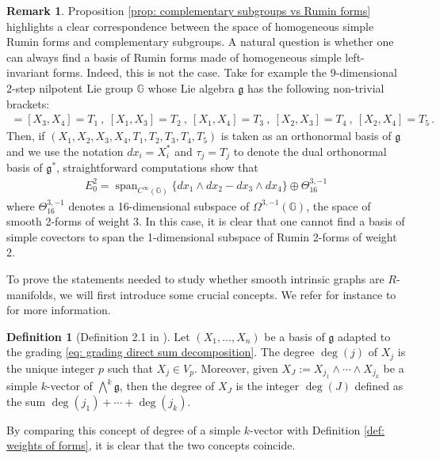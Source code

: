\documentclass[dvipsnames]{amsart}
\theoremstyle{definition}
\newtheorem{definition}[theorem]{Definition}
\newtheorem{remark}[theorem]{Remark}
\theoremstyle{definition}
\numberwithin{equation}{section}
\newcommand{\G}{\mathbb{G}}
\begin{document}
\begin{remark}\label{rmk: example Rumin forms nonsimple}
Proposition \ref{prop: complementary subgroups vs Rumin forms} highlights a clear correspondence between the space of homogeneous simple Rumin forms and complementary subgroups.
    A natural question is whether one can always find a basis of Rumin forms made of homogeneous simple left-invariant forms. Indeed, this is not the case. Take for example the 9-dimensional 2-step nilpotent Lie group $\G$ whose Lie algebra $\mathfrak{g}$ has the following non-trivial brackets:
    \begin{align*}
        [X_1,X_2]=[X_3,X_4]=T_1\ ,\ [X_1,X_3]=T_2\ ,\ [X_1,X_4]=T_3\ ,\ [X_2,X_3]=T_4\ ,\ [X_2,X_4]=T_5\,.
    \end{align*}
    Then, if $(X_1,X_2,X_3,X_4,T_1,T_2,T_3,T_4,T_5)$ is taken as an orthonormal basis of $\mathfrak{g}$ and we use the notation $dx_i=X_i^\ast$ and $\tau_j=T_j$ to denote the dual orthonormal basis of $\mathfrak{g}^\ast$, straightforward computations show that
    \begin{align*}
        E_0^2=\operatorname{span}_{C^\infty(\G)}\{dx_1\wedge dx_2-dx_3\wedge dx_4\}\oplus \Theta^{3,-1}_{16}
    \end{align*}
    where $\Theta^{3,-1}_{16}$ denotes a 16-dimensional subspace of $\Omega^{3,-1}(\G)$, the space of smooth 2-forms of weight 3. In this case, it is clear that one cannot find a basis of simple covectors to span the 1-dimensional subspace of Rumin 2-forms of weight 2.
\end{remark}



To prove the statements needed to study whether smooth intrinsic graphs are $R$-manifolds, we will first introduce some crucial concepts. We refer for instance to \cite{Magnani2019Area,corni2026minimal} for more information. 

\begin{definition}[Definition 2.1 in \cite{Mag13Vit}] Let $(X_1,\ldots,X_n)$ be a basis of $\mathfrak{g}$ adapted to the grading \eqref{eq: grading direct sum decomposition}. The degree $\operatorname{deg}(j)$ of $X_j$ is the unique integer $p$ such that $X_j\in V_p$. Moreover, given $X_J:=X_{j_1}\wedge\cdots\wedge X_{j_k}$ be a simple $k$-vector of $\bigwedge^k\mathfrak{g}$, then the degree of $X_J$ is the integer $\operatorname{deg}(J)$ defined as the sum $\operatorname{deg}(j_1)+\cdots+\operatorname{deg}(j_k)$.    
\end{definition}
By comparing this concept of degree of a simple $k$-vector with Definition \ref{def: weights of forms}, it is clear that the two concepts coincide.
\end{document}
